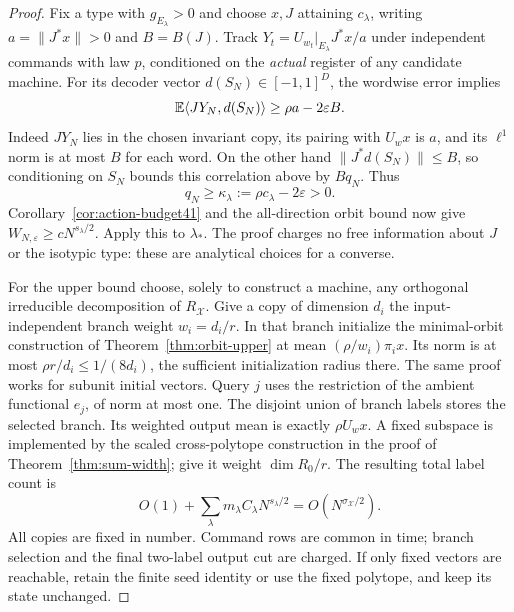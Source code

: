 \begin{proof}
Fix a type with $g_{E_\lambda}>0$ and choose $x,J$ attaining
$c_\lambda$, writing $a=\|J^*x\|>0$ and $B=B(J)$. Track
$Y_t=U_{w_t}|_{E_\lambda}J^*x/a$ under independent commands with law
$p$, conditioned on the \emph{actual} register of any candidate machine.
For its decoder vector $d(S_N)\in[-1,1]^D$, the wordwise error implies
\[
 \mathbb E\langle JY_N,d(S_N)\rangle\ge\rho a-2\varepsilon B.
\]
Indeed $JY_N$ lies in the chosen invariant copy, its pairing with
$U_wx$ is $a$, and its $\ell^1$ norm is at most $B$ for each word.
On the other hand $\|J^*d(S_N)\|\le B$, so conditioning on $S_N$
bounds this correlation above by $Bq_N$. Thus
\begin{equation}\label{eq:kappa-canonical41}
 q_N\ge\kappa_\lambda:=\rho c_\lambda-2\varepsilon>0.
\end{equation}
Corollary~\ref{cor:action-budget41} and the all-direction orbit bound
now give $W_{N,\varepsilon}\ge cN^{s_\lambda/2}$. Apply this to
$\lambda_*$. The proof charges no free information about $J$ or the
isotypic type: these are analytical choices for a converse.

For the upper bound choose, solely to construct a machine, any orthogonal
irreducible decomposition of $R_{\mathcal X}$. Give a copy of dimension
$d_i$ the input-independent branch weight $w_i=d_i/r$. In that branch
initialize the minimal-orbit construction of Theorem~\ref{thm:orbit-upper}
at mean $(\rho/w_i)\pi_i x$. Its norm is at most
$\rho r/d_i\le1/(8d_i)$, the sufficient initialization radius there.
The same proof works for subunit initial vectors. Query $j$ uses the
restriction of the ambient functional $e_j$, of norm at most one.
The disjoint union of branch labels stores the selected branch. Its
weighted output mean is exactly $\rho U_wx$. A fixed subspace is
implemented by the scaled cross-polytope construction in the proof of
Theorem~\ref{thm:sum-width}; give it weight $\dim R_0/r$.
The resulting total label count is
\[
 O(1)+\sum_{\lambda}m_\lambda C_\lambda N^{s_\lambda/2}
                      =O(N^{\sigma_{\mathcal X}/2}).
\]
All copies are fixed in number. Command rows are common in time;
branch selection and the final two-label output cut are charged.
If only fixed vectors are reachable, retain the finite seed identity
or use the fixed polytope, and keep its state unchanged.
\end{proof}

